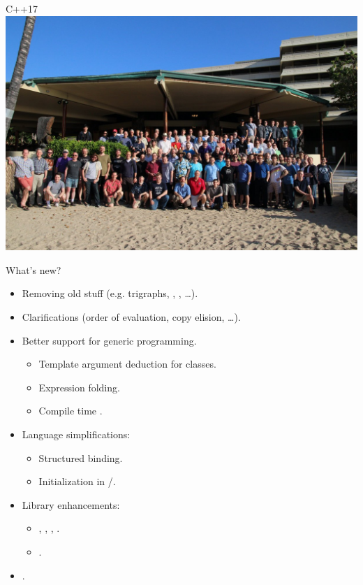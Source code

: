 \begin{frame}[t]{C++17}
\includegraphics[width=\textwidth]{img/cpp-17.jpg}
\end{frame}

\begin{frame}[t]{What's new?}
\begin{itemize}
  \item Removing old stuff (e.g. trigraphs, , , \ldots).
  \vfill\pause
  \item Clarifications (order of evaluation, copy elision, \ldots).
  \vfill\pause
  \item Better support for generic programming.
    \begin{itemize}
      \item Template argument deduction for classes.
      \item Expression folding.
      \item Compile time .
    \end{itemize}
  \vfill\pause
  \item Language simplifications:
    \begin{itemize}
      \item Structured binding.
      \item Initialization in /.
    \end{itemize}
  \vfill\pause
  \item Library enhancements:
    \begin{itemize}
      \item {}, , , .
      \item {}.
    \end{itemize}
  \vfill\pause
  \item {}.
\end{itemize}
\end{frame}
